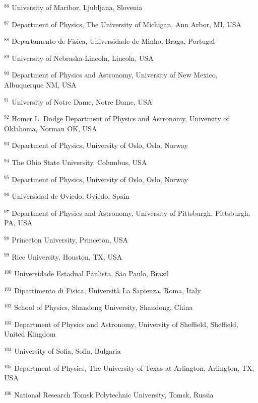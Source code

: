 \par {\footnotesize $^{86}$ University of Maribor, Ljubljana, Slovenia}
\par {\footnotesize $^{87}$ Department of Physics, The University of Michigan, Ann Arbor, MI, USA}
\par {\footnotesize $^{88}$ Departamento de Fisica, Universidade de Minho, Braga, Portugal}
\par {\footnotesize $^{89}$ University of Nebraska-Lincoln, Lincoln, USA}
\par {\footnotesize $^{90}$ Department of Physics and Astronomy, University of New Mexico, Albuquerque NM, USA}
\par {\footnotesize $^{91}$ University of Notre Dame, Notre Dame, USA}
\par {\footnotesize $^{92}$ Homer L. Dodge Department of Physics and Astronomy, University of Oklahoma, Norman OK, USA}
\par {\footnotesize $^{93}$ Department of Physics, University of Oslo, Oslo, Norway}
\par {\footnotesize $^{94}$ The Ohio State University, Columbus, USA}
\par {\footnotesize $^{95}$ Department of Physics, University of Oslo, Oslo, Norway}
\par {\footnotesize $^{96}$ Universidad de Oviedo, Oviedo, Spain}
\par {\footnotesize $^{97}$ Department of Physics and Astronomy, University of Pittsburgh, Pittsburgh, PA, USA}
\par {\footnotesize $^{98}$ Princeton University, Princeton, USA}
\par {\footnotesize $^{99}$ Rice University, Houston, TX, USA}
\par {\footnotesize $^{100}$ Universidade Estadual Paulista, São Paulo, Brazil}
\par {\footnotesize $^{101}$ Dipartimento di Fisica, Università La Sapienza, Roma, Italy}
\par {\footnotesize $^{102}$ School of Physics, Shandong University, Shandong, China}
\par {\footnotesize $^{103}$ Department of Physics and Astronomy, University of Sheffield, Sheffield, United Kingdom}
\par {\footnotesize $^{104}$ University of Sofia, Sofia, Bulgaria}
\par {\footnotesize $^{105}$ Department of Physics, The University of Texas at Arlington, Arlington, TX, USA}
\par {\footnotesize $^{106}$ National Research Tomsk Polytechnic University, Tomsk, Russia}
